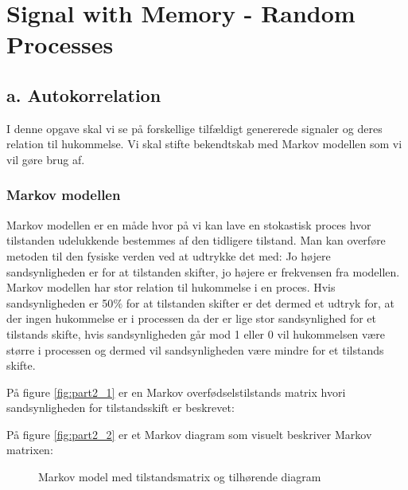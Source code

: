 \chapter{Signal with Memory - Random Processes}
\label{ch:part2}

\section{a. Autokorrelation}
I denne opgave skal vi se på forskellige tilfældigt genererede signaler og deres relation til hukommelse. Vi skal stifte bekendtskab med Markov modellen som vi vil gøre brug af.\\
\subsection{Markov modellen}
Markov modellen er en måde hvor på vi kan lave en stokastisk proces hvor tilstanden udelukkende bestemmes af den tidligere tilstand. Man kan overføre metoden til den fysiske verden ved at udtrykke det med: Jo højere sandsynligheden er for at tilstanden skifter, jo højere er frekvensen fra modellen. Markov modellen har stor relation til hukommelse i en proces. Hvis sandsynligheden er 50$\%$ for at tilstanden skifter er det dermed et udtryk for, at der ingen hukommelse er i processen da der er lige stor sandsynlighed for et tilstands skifte, hvis sandsynligheden går mod 1 eller 0 vil hukommelsen være større i processen og dermed vil sandsynligheden være mindre for et tilstands skifte.

 På figure \ref{fig:part2_1} er en Markov overfødselstilstands matrix hvori sandsynligheden for tilstandsskift er beskrevet:  

På figure \ref{fig:part2_2} er et Markov diagram som visuelt beskriver Markov matrixen:

 \begin{figure}[!h]
	\centering
	\caption{Markov model med tilstandsmatrix og tilhørende diagram}
	\label{fig:part2_markov}
\end{figure}
 

